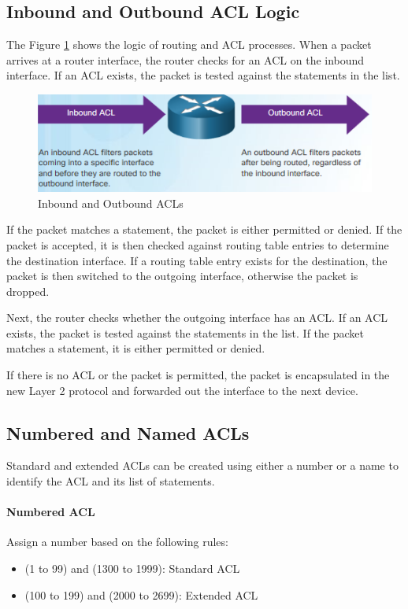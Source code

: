 \subsection{Inbound and Outbound ACL Logic}
The Figure \ref{InOut} shows the logic of routing and ACL processes. When a packet arrives at a router interface, the router checks for an ACL on the inbound interface. If an ACL exists, the packet is tested against the statements in the list.\par 
	\begin{figure}[hbtp]
	\caption{Inbound and Outbound ACLs}\label{InOut}
	\centering
	\includegraphics[scale=1]{pictures/InOut.PNG}
	\end{figure}
If the packet matches a statement, the packet is either permitted or denied. If the packet is accepted, it is then checked against routing table entries to determine the destination interface. If a routing table entry exists for the destination, the packet is then switched to the outgoing interface, otherwise the packet is dropped.\par 
Next, the router checks whether the outgoing interface has an ACL. If an ACL exists, the packet is tested against the statements in the list. If the packet matches a statement, it is either permitted or denied.\par 
If there is no ACL or the packet is permitted, the packet is encapsulated in the new Layer 2 protocol and forwarded out the interface to the next device.
\subsection{Numbered and Named ACLs}
Standard and extended ACLs can be created using either a number or a name to identify the
ACL and its list of statements.
\paragraph{Numbered ACL} Assign a number based on the following rules:
	\begin{itemize}
		\item (1 to 99) and (1300 to 1999): Standard ACL
		\item (100 to 199) and (2000 to 2699): Extended ACL
	\end{itemize}
